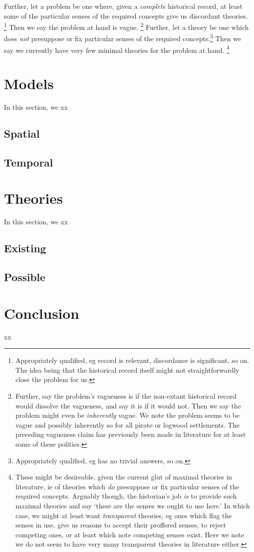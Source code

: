 		Further, let a  problem be one where, given a \emph{complete} historical record, at least some of the particular senses of the required concepts give us discordant theories.%
		\footnote{Appropriately qualified, eg record is relevant, discordance is significant, so on. The idea being that the historical record itself might not straightforwardly close the problem for us.}
		Then we say the problem at hand is vague.%
		\footnote{Further, say the problem's vagueness is  if the non-extant historical record would dissolve the vagueness, and say it is  if it would not. Then we say the problem might even be \emph{inherently} vague. We note the problem seems to be vague and possibly inherently so for all pirate or logwood settlements. The preceding vagueness claim has previously been made in literature for at least some of these polities.}
		Further, let a  theory be one which does \emph{not} presuppose or fix particular senses of the required concepts.\footnote{Appropriately qualified, eg has no trivial answers, so on.} Then we say we currently have very few minimal theories for the problem at hand.%
		\footnote{These might be desireable, given the current glut of maximal theories in literature, ie of theories which \emph{do} presuppose or fix particular senses of the required concepts. Arguably though, the historian's job \emph{is} to provide such maximal theories and say `these are the senses we ought to use here.' In which case, we might at least want \emph{transparent} theories, eg ones which flag the senses in use, give us reasons to accept their proffered senses, to reject competing ones, or at least which note competing senses exist. Here we note we do not seem to have very many transparent theories in literature either.}
%
%
%
\section{Models}
\label{s:models}
	In this section, we xx
	\subsection{Spatial}
	\label{ss:spatial}
	\subsection{Temporal}
	\label{ss:temporal}
%
%
%
\section{Theories}
\label{s:theories}
	In this section, we xx
	\subsection{Existing}
	\label{ss:existing}
	\subsection{Possible}
	\label{ss:possible}
%
%
%
\section{Conclusion}
\label{s:concl}
	xx
%
%
%
